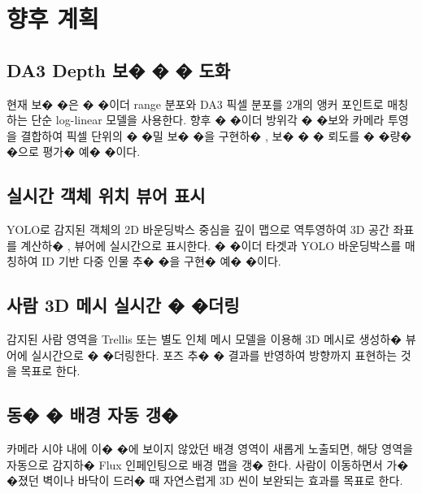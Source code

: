 \documentclass[a4paper,12pt]{article}
\begin{document}
\section{향후 계획}

\subsection{DA3 Depth 보� � � 도화}

현재 보� �은 � �이더 range 분포와 DA3 픽셀 분포를 2개의 앵커 포인트로 매칭하는
단순 log-linear 모델을 사용한다.
향후 � �이더 방위각 � �보와 카메라 투영을 결합하여 픽셀 단위의 � �밀 보� �을 구현하� ,
보� � � 뢰도를 � �량� �으로 평가�  예� �이다.

\subsection{실시간 객체 위치 뷰어 표시}

YOLO로 감지된 객체의 2D 바운딩박스 중심을 깊이 맵으로 역투영하여
3D 공간 좌표를 계산하� , 뷰어에 실시간으로 표시한다.
� �이더 타겟과 YOLO 바운딩박스를 매칭하여 ID 기반 다중 인물 추� �을 구현�  예� �이다.

\subsection{사람 3D 메시 실시간 � �더링}

감지된 사람 영역을 Trellis 또는 별도 인체 메시 모델을 이용해
3D 메시로 생성하�  뷰어에 실시간으로 � �더링한다.
포즈 추� � 결과를 반영하여 방향까지 표현하는 것을 목표로 한다.

\subsection{동� � 배경 자동 갱� }

카메라 시야 내에 이� �에 보이지 않았던 배경 영역이 새롭게 노출되면,
해당 영역을 자동으로 감지하�  Flux 인페인팅으로 배경 맵을 갱� 한다.
사람이 이동하면서 가� �졌던 벽이나 바닥이 드러�  때
자연스럽게 3D 씬이 보완되는 효과를 목표로 한다.
\end{document}

